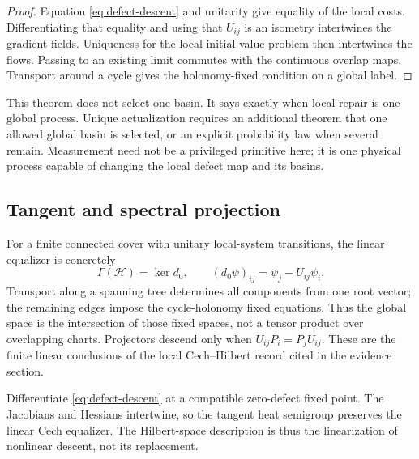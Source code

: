 \documentclass[11pt,a4paper]{article}
\begin{document}
\begin{proof}
Equation \eqref{eq:defect-descent} and unitarity give equality of the local
costs.  Differentiating that equality and using that \(U_{ij}\) is an
isometry intertwines the gradient fields.  Uniqueness for the local
initial-value problem then intertwines the flows.  Passing to an existing
limit commutes with the continuous overlap maps.  Transport around a cycle
gives the holonomy-fixed condition on a global label.
\end{proof}

This theorem does not select one basin.  It says exactly when local repair is
one global process.  Unique actualization requires an additional theorem
that one allowed global basin is selected, or an explicit probability law
when several remain.  Measurement need not be a privileged primitive here;
it is one physical process capable of changing the local defect map and its
basins.

\subsection{Tangent and spectral projection}

For a finite connected cover with unitary local-system transitions, the
linear equalizer is concretely
\[
\Gamma(\mathcal H)=\ker d_0,\qquad
(d_0\psi)_{ij}=\psi_j-U_{ij}\psi_i.
\]
Transport along a spanning tree determines all components from one root
vector; the remaining edges impose the cycle-holonomy fixed equations.
Thus the global space is the intersection of those fixed spaces, not a
tensor product over overlapping charts. Projectors descend only when
\(U_{ij}P_i=P_jU_{ij}\). These are the finite linear conclusions of the
local Cech--Hilbert record cited in the evidence section.

Differentiate \eqref{eq:defect-descent} at a compatible zero-defect fixed
point.  The Jacobians and Hessians intertwine, so the tangent heat semigroup
preserves the linear Cech equalizer.  The Hilbert-space description is thus
the linearization of nonlinear descent, not its replacement.
\end{document}
